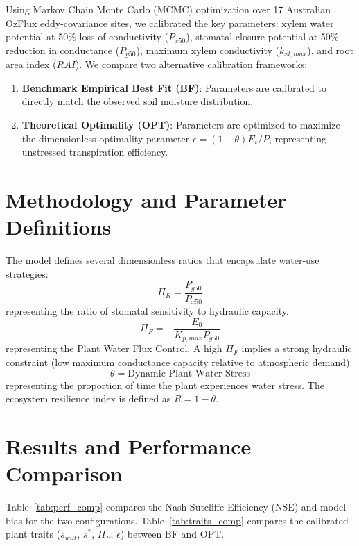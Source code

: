 \documentclass[11pt,a4paper]{article}
\begin{document}
Using Markov Chain Monte Carlo (MCMC) optimization over 17 Australian OzFlux eddy-covariance sites, we calibrated the key parameters: xylem water potential at 50\% loss of conductivity ($P_{x50}$), stomatal closure potential at 50\% reduction in conductance ($P_{g50}$), maximum xylem conductivity ($k_{xl,max}$), and root area index ($RAI$). We compare two alternative calibration frameworks:
\begin{enumerate}
    \item \textbf{Benchmark Empirical Best Fit (BF)}: Parameters are calibrated to directly match the observed soil moisture distribution.
    \item \textbf{Theoretical Optimality (OPT)}: Parameters are optimized to maximize the dimensionless optimality parameter $\epsilon = (1-\theta)E_t/P$, representing unstressed transpiration efficiency.
\end{enumerate}

\section{Methodology and Parameter Definitions}
The model defines several dimensionless ratios that encapsulate water-use strategies:
\begin{equation}
    \Pi_R = \frac{P_{g50}}{P_{x50}}
\end{equation}
representing the ratio of stomatal sensitivity to hydraulic capacity.
\begin{equation}
    \Pi_F = -\frac{E_0}{K_{p,max} P_{g50}}
\end{equation}
representing the Plant Water Flux Control. A high $\Pi_F$ implies a strong hydraulic constraint (low maximum conductance capacity relative to atmospheric demand).
\begin{equation}
    \theta = \text{Dynamic Plant Water Stress}
\end{equation}
representing the proportion of time the plant experiences water stress. The ecosystem resilience index is defined as $R = 1-\theta$.

\section{Results and Performance Comparison}
Table~\ref{tab:perf_comp} compares the Nash-Sutcliffe Efficiency (NSE) and model bias for the two configurations. Table~\ref{tab:traits_comp} compares the calibrated plant traits ($s_{wilt}$, $s^*$, $\Pi_F$, $\epsilon$) between BF and OPT.
\end{document}

